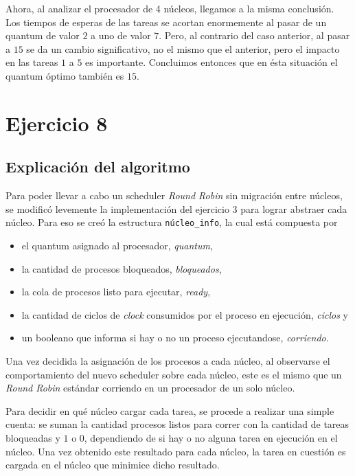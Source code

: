 \documentclass[a4paper]{article}
\begin{document}
Ahora, al analizar el procesador de 4 núcleos, llegamos a la misma
conclusión. Los tiempos de esperas de las tareas se acortan enormemente
al pasar de un quantum de valor $2$ a uno de valor $7$. Pero, al contrario
del caso anterior, al pasar a $15$ se da un cambio significativo, no el
mismo que el anterior, pero el impacto en las tareas $1$ a $5$ es
importante. Concluimos entonces que en ésta situación el quantum óptimo
también es $15$.

\newpage

\section{Ejercicio 8}

\subsection{Explicación del algoritmo}
Para poder llevar a cabo un scheduler \textit{Round Robin} sin migración
entre núcleos, se modificó levemente la implementación del ejercicio 3 para
lograr abstraer cada núcleo. Para eso se creó la estructura
\verb|núcleo_info|, la cual está compuesta por

\begin{itemize}
  \item el quantum asignado al procesador, \textit{quantum},
  \item la cantidad de procesos bloqueados, \textit{bloqueados},
  \item la cola de procesos listo para ejecutar, \textit{ready},
  \item la cantidad de ciclos de \textit{clock} consumidos por el proceso en
  ejecución, \textit{ciclos} y
  \item un booleano que informa si hay o no un proceso ejecutandose,
  \textit{corriendo}.
\end{itemize}

Una vez decidida la asignación de los procesos a cada núcleo, al observarse
el comportamiento del nuevo scheduler sobre cada núcleo, este es el mismo
que un \textit{Round Robin} estándar corriendo en un procesador de un solo
núcleo.

Para decidir en qué núcleo cargar cada tarea, se procede a realizar una
simple cuenta: se suman la cantidad procesos listos para correr con la
cantidad de tareas bloqueadas y $1$ o $0$, dependiendo de si hay o no alguna
tarea en ejecución en el núcleo. Una vez obtenido este resultado para cada
núcleo, la tarea en cuestión es cargada en el núcleo que minimice dicho
resultado.
\end{document}
